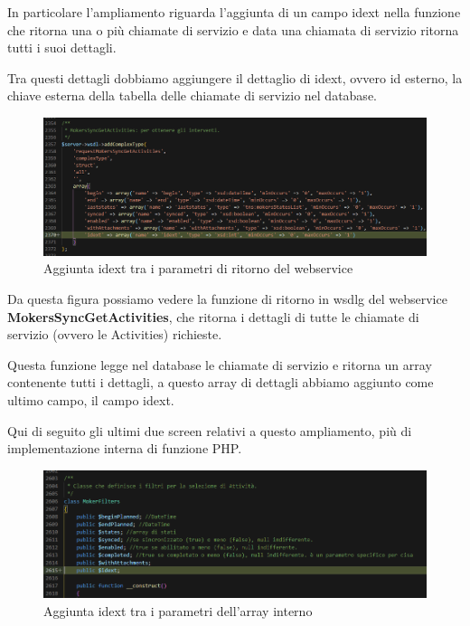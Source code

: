 \newspace
\begin{flushleft}
	In particolare l'ampliamento riguarda l'aggiunta di un campo idext nella funzione che ritorna una o più chiamate di servizio e data una chiamata di servizio ritorna tutti i suoi dettagli.
	
	Tra questi dettagli dobbiamo aggiungere il dettaglio di idext, ovvero id esterno, la chiave esterna della tabella delle chiamate di servizio nel database.
\end{flushleft}
\newspace
\begin{figure}[!h] 
	\centering
	\includegraphics[scale = 0.4]{immagini/webservices/ampliamenti/1ampl_types_changefunction} 
	\caption{Aggiunta idext tra i parametri di ritorno del webservice}
\end{figure}
\newspace
\begin{flushleft}
	Da questa figura possiamo vedere la funzione di ritorno in \gls{wsdlg} del webservice \textbf{MokersSyncGetActivities}, che ritorna i dettagli di tutte le chiamate di servizio (ovvero le Activities) richieste. 
	
	Questa funzione legge nel database le chiamate di servizio e ritorna un array contenente tutti i dettagli, a questo array di dettagli abbiamo aggiunto come ultimo campo, il campo idext.
\end{flushleft}

\newpage

\begin{flushleft}
	Qui di seguito gli ultimi due screen relativi a questo ampliamento, più di implementazione interna di funzione PHP.
\end{flushleft}
\begin{figure}[!h] 
	\centering
	\includegraphics[scale = 0.5]{immagini/webservices/ampliamenti/1ampl_utils_filters.png}
	\caption{Aggiunta idext tra i parametri dell'array interno}
\end{figure}

